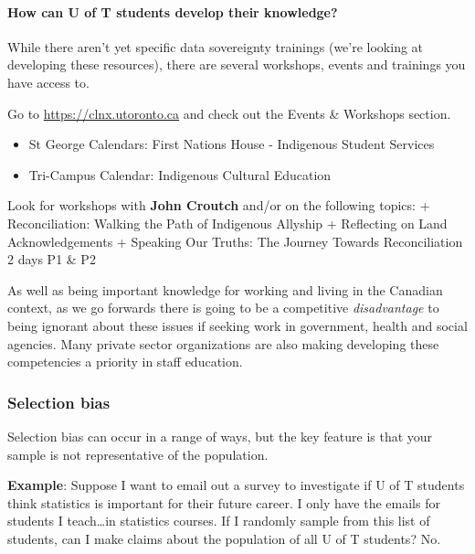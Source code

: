 \documentclass[
  openany]{book}
\providecommand{\tightlist}{%
  \setlength{\itemsep}{0pt}\setlength{\parskip}{0pt}}
\begin{document}
\hypertarget{how-can-u-of-t-students-develop-their-knowledge}{%
\paragraph{How can U of T students develop their knowledge?}\label{how-can-u-of-t-students-develop-their-knowledge}}

While there aren't yet specific data sovereignty trainings (we're looking at developing these resources), there are several workshops, events and trainings you have access to.

Go to \url{https://clnx.utoronto.ca} and check out the Events \& Workshops section.

\begin{itemize}
\tightlist
\item
  St George Calendars: First Nations House - Indigenous Student Services
\item
  Tri-Campus Calendar: Indigenous Cultural Education
\end{itemize}

Look for workshops with \textbf{John Croutch} and/or on the following topics:
+ Reconciliation: Walking the Path of Indigenous Allyship
+ Reflecting on Land Acknowledgements
+ Speaking Our Truths: The Journey Towards Reconciliation \textbar{} 2 days P1 \& P2

As well as being important knowledge for working and living in the Canadian context, as we go forwards there is going to be a competitive \emph{disadvantage} to being ignorant about these issues if seeking work in government, health and social agencies. Many private sector organizations are also making developing these competencies a priority in staff education.

\hypertarget{selection-bias}{%
\subsubsection{Selection bias}\label{selection-bias}}

Selection bias can occur in a range of ways, but the key feature is that your sample is not representative of the population.

\textbf{Example}: Suppose I want to email out a survey to investigate if U of T students think statistics is important for their future career. I only have the emails for students I teach\ldots in statistics courses. If I randomly sample from this list of students, can I make claims about the population of all U of T students? No.
\end{document}
